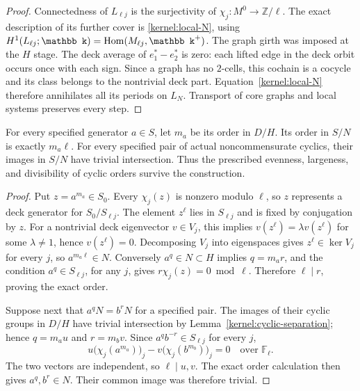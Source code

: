 \begin{proof}
Connectedness of \(L_{\ell j}\) is the surjectivity of
\(\chi_j:M^0\to\mathbb Z/\ell\).  The exact description of its further
cover is \eqref{kernel:local-N}, using
\(H^1(L_{\ell j};\mathbb k)=\Hom(M_{\ell j},\mathbb k^+)\).
The graph girth was imposed at the \(H\) stage.
The deck average of \(e_1^*-e_2^*\) is zero: each lifted edge in the
deck orbit occurs once with each sign.  Since a graph has no
\(2\)-cells, this cochain is a cocycle and its class belongs to the
nontrivial deck part.  Equation~\eqref{kernel:local-N} therefore
annihilates all its periods on \(L_N\).  Transport of core graphs and
local systems preserves every step.
\end{proof}

\begin{proposition}\label{kernel:orders}
For every specified generator \(a\in S\), let \(m_a\) be its order in
\(D/H\).  Its order in \(S/N\) is exactly \(m_a\ell\).  For every
specified pair of actual noncommensurate cyclics, their images in
\(S/N\) have trivial intersection.  Thus the prescribed evenness,
largeness, and divisibility of cyclic orders survive the construction.
\end{proposition}

\begin{proof}
Put \(z=a^{m_a}\in S_0\).  Every \(\chi_j(z)\) is nonzero modulo
\(\ell\), so \(z\) represents a deck generator for
\(S_0/S_{\ell j}\).  The element \(z^\ell\) lies in \(S_{\ell j}\)
and is fixed by conjugation by \(z\).  For a nontrivial deck
eigenvector \(v\in V_j\), this implies
\(v(z^\ell)=\lambda v(z^\ell)\) for some \(\lambda\ne1\), hence
\(v(z^\ell)=0\).  Decomposing \(V_j\) into eigenspaces gives
\(z^\ell\in\ker V_j\) for every \(j\), so \(a^{m_a\ell}\in N\).
Conversely \(a^q\in N\subset H\) implies \(q=m_ar\), and the condition
\(a^q\in S_{\ell j}\), for any \(j\), gives
\(r\chi_j(z)=0\bmod\ell\).  Therefore \(\ell\mid r\), proving the
exact order.

Suppose next that \(a^qN=b^rN\) for a specified pair.  The images of
their cyclic groups in \(D/H\) have trivial intersection by
Lemma~\ref{kernel:cyclic-separation}; hence \(q=m_au\) and \(r=m_bv\).
Since \(a^qb^{-r}\in S_{\ell j}\) for every \(j\),
\[
              u\bigl(\chi_j(a^{m_a})\bigr)_j
                  -v\bigl(\chi_j(b^{m_b})\bigr)_j=0
                       \quad\text{over }\mathbb F_\ell .
\]
The two vectors are independent, so \(\ell\mid u,v\).
The exact order calculation then gives \(a^q,b^r\in N\).  Their
common image was therefore trivial.
\end{proof}

